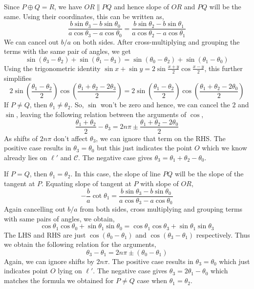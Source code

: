 \noindent
Since $P \oplus Q = R$, we have $OR \parallel PQ$ and hence slope of $OR$ and $PQ$
will be the same. Using their coordinates, this can be written as,
\[
    \frac{b \sin \theta_3 - b \sin \theta_0}{a \cos \theta_3 - a \cos \theta_0}
    = \frac{b \sin \theta_2 - b \sin \theta_1}{a \cos \theta_2 - a \cos \theta_1}
\]
We can cancel out $b/a$ on both sides. After cross-multiplying and grouping the
terms with the same pair of angles, we get
\[
    \sin(\theta_3 - \theta_2) + \sin(\theta_1 - \theta_3)
    = \sin(\theta_0 - \theta_2) + \sin(\theta_1 - \theta_0)
\]
Using the trigonometric identity
$\sin x + \sin y = 2 \sin\frac{x+y}{2}\cos\frac{x-y}{2}$, this further simplifies
\[
    2\sin\left(\frac{\theta_1 - \theta_2}{2}\right)\cos\left(\frac{\theta_1 + \theta_2 - 2\theta_3}{2}\right)
    = 2\sin\left(\frac{\theta_1 - \theta_2}{2}\right)\cos\left(\frac{\theta_1 + \theta_2 - 2\theta_0}{2}\right)
\]
If $P \neq Q$, then $\theta_1 \neq \theta_2$. So, $\sin$ won't be zero and hence, we
can cancel the $2$ and $\sin$, leaving the following relation between the
arguments of $\cos$,
\[
    \frac{\theta_1 + \theta_2}{2} - \theta_3
    = 2n\pi \pm \frac{\theta_1 + \theta_2 - 2\theta_0}{2}
\]
As shifts of $2n\pi$ don't affect $\theta_3$, we can ignore that term on the RHS.
The positive case results in $\theta_3 = \theta_0$ but this just indicates the
point $O$ which we know already lies on $\ell'$ and $\mathcal{C}$. The negative case
gives $\theta_3 = \theta_1 + \theta_2 - \theta_0$.
\vspace{1ex}

\noindent
If $P=Q$, then $\theta_1 = \theta_2$. In this case, the slope of line $PQ$ will be
the slope of the tangent at $P$. Equating slope of tangent at $P$ with slope of
$OR$,
\[
    -\frac{b}{a}\cot\theta_1
    = \frac{b \sin \theta_3 - b \sin \theta_0}{a \cos \theta_3 - a \cos \theta_0}
\]
Again cancelling out $b/a$ from both sides, cross multiplying and grouping terms
with same pairs of angles, we obtain,
\[
    \cos\theta_1\cos\theta_0 + \sin\theta_1\sin\theta_0
    = \cos\theta_1\cos\theta_3 + \sin\theta_1\sin\theta_3
\]
The LHS and RHS are just $\cos(\theta_0 - \theta_1)$ and $\cos(\theta_3-\theta_1)$
respectively. Thus we obtain the following relation for the arguments,
\[
    \theta_3 - \theta_1 = 2n\pi \pm (\theta_0 - \theta_1)
\]
Again, we can ignore shifts by $2n\pi$. The positive case results in
$\theta_3 = \theta_0$ which just indicates point $O$ lying on $\ell'$. The
negative case gives $\theta_3 = 2\theta_1 - \theta_0$ which matches the formula
we obtained for $P \neq Q$ case when $\theta_1 = \theta_2$.
\vspace{1ex}

